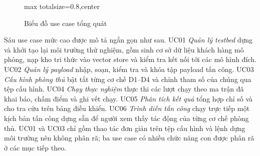 \documentclass[../DoAn.tex]{subfiles}
\begin{document}
\begin{figure}[htbp]
	\centering
	\begin{adjustbox}{max totalsize={\linewidth}{0.8\textheight},center}
\end{adjustbox}
	\caption{Biểu đồ use case tổng quát}
	\label{fig:uc-tongquat}
\end{figure}

Sáu use case mức cao được mô tả ngắn gọn như sau. UC01 \textit{Quản lý testbed} dựng và khởi tạo lại môi trường thử nghiệm, gồm sinh cơ sở dữ liệu khách hàng mô phỏng, nạp kho tri thức vào vector store và kiểm tra kết nối tới các mô hình đích. UC02 \textit{Quản lý payload} nhập, soạn, kiểm tra và khóa tập payload tấn công. UC03 \textit{Cấu hình phòng thủ} bật tắt từng cơ chế D1--D4 và chỉnh tham số của chúng qua tệp cấu hình. UC04 \textit{Chạy thực nghiệm} thực thi các lượt chạy theo ma trận đã khai báo, chấm điểm và ghi vết chạy. UC05 \textit{Phân tích kết quả} tổng hợp chỉ số và cho tra cứu trên bảng điều khiển. UC06 \textit{Trình diễn tấn công} chạy trực tiếp một kịch bản tấn công dựng sẵn để người xem thấy tác động của từng cơ chế phòng thủ. UC01 và UC03 chỉ gồm thao tác đơn giản trên tệp cấu hình và lệnh dựng môi trường nên không phân rã; ba use case có nhiều chức năng con được phân rã ở các mục tiếp theo.
\end{document}
